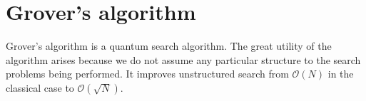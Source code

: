 \chapter{Grover's algorithm}
Grover's algorithm is a quantum search algorithm. The great utility of the  algorithm arises because we do not assume any particular structure to the search problems being performed. It improves unstructured search from $\mathcal{O}(N)$ in the classical case to $\mathcal{O}(\sqrt{N})$.




